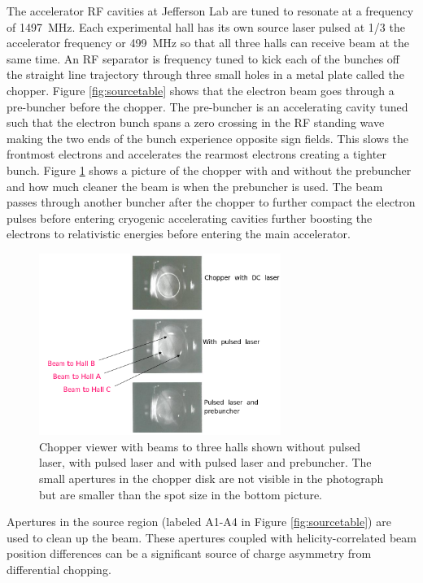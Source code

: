 The accelerator RF cavities at Jefferson Lab are tuned to resonate at a frequency of 1497~MHz. Each experimental hall has its own source laser pulsed at 1/3 the accelerator frequency or 499~MHz so that all three halls can receive beam at the same time. An RF separator is frequency tuned to kick each of the bunches off the straight line trajectory through three small holes in a metal plate called the chopper. Figure \ref{fig:sourcetable} shows that the electron beam goes through a pre-buncher before the chopper. The pre-buncher is an accelerating cavity tuned such that the electron bunch spans a zero crossing in the RF standing wave making the two ends of the bunch experience opposite sign fields. This slows the frontmost electrons and accelerates the rearmost electrons creating a tighter bunch. Figure \ref{fig:prebuncher} shows a picture of the chopper with and without the prebuncher and how much cleaner the beam is when the prebuncher is used. The beam passes through another buncher after the chopper to further compact the electron pulses before entering cryogenic accelerating cavities further boosting the electrons to relativistic energies before entering the main accelerator. 
\begin{figure}[ht]
\begin{center} 
\includegraphics[width=0.7\textwidth]{Pictures/chopper.png}
\caption{ \label{fig:prebuncher} Chopper viewer with beams to three halls shown without pulsed laser, with pulsed laser and with pulsed laser and prebuncher. The small apertures in the chopper disk are not visible in the photograph but are smaller than the spot size in the bottom picture. 
}
\end{center}
\end{figure}
 
Apertures in the source region (labeled A1-A4 in Figure \ref{fig:sourcetable}) are used to clean up the beam. These apertures coupled with helicity-correlated beam position differences can be a significant source of charge asymmetry from differential chopping. 

